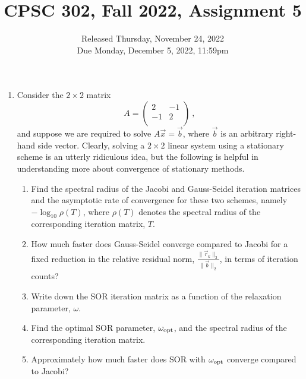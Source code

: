 \documentclass[11pt]{article}
\title{CPSC 302, Fall 2022, Assignment 5}
\author{Released Thursday, November 24, 2022 \\
Due Monday, December 5, 2022, 11:59pm}
\date{}
\newcommand{\xx}{\vec{x}}
\newcommand{\bb}{\vec{b}}
\newcommand{\rr}{\vec{r}}
\begin{document}
\maketitle 

\begin{enumerate}
\item Consider the $2 \times 2$ matrix
$$
A=\left( \begin{array}{cc}
2 & -1   \\
-1 & 2  \\
\end{array} \right)
\ ,
$$
and suppose we are required to solve $A \xx=\bb$, where $\bb$ is an arbitrary right-hand side vector. Clearly, solving a $2
\times 2$ linear system using a stationary scheme is an utterly ridiculous idea,
but the following is helpful in understanding
 more about convergence  of stationary methods.
\begin {enumerate}
\item Find the spectral radius of the Jacobi and
Gauss-Seidel iteration matrices and the asymptotic rate of
convergence for these two schemes, namely $-\log_{10} \rho(T)$, where $\rho(T)$ denotes the spectral radius of the corresponding iteration matrix, $T$. 
\item How much faster does Gauss-Seidel converge compared to Jacobi for a fixed reduction in the relative residual norm, $\frac{\| \rr_k \|_2}{\| \bb \|_2}$, in terms of iteration counts?
\item Write down the SOR iteration matrix as a function of the relaxation parameter, $\omega$.  
\item Find the optimal SOR parameter, $\omega_{\rm opt}$,
and the spectral radius of the corresponding iteration matrix.
\item Approximately how much faster does SOR with $\omega_{\rm opt}$ converge
compared to Jacobi?
\end{enumerate}


\end{enumerate}
\end{document}
